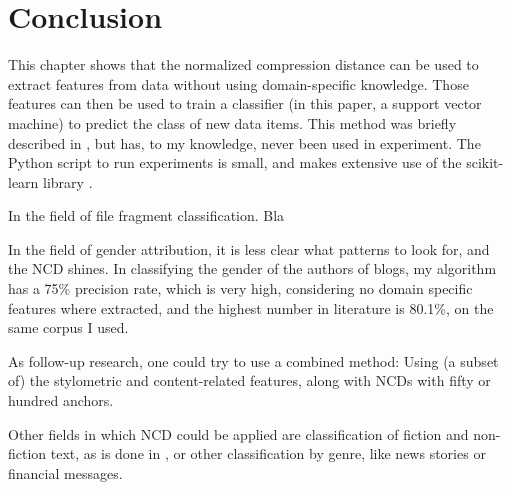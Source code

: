 \section{Conclusion}

This chapter shows that the normalized compression distance can be used to extract features from data without using domain-specific knowledge. Those features can then be used to train a classifier (in this paper, a support vector machine) to predict the class of new data items. This method was briefly described in \cite{Cilibrasi2007}, but has, to my knowledge, never been used in experiment. The Python script to run experiments is small, and makes extensive use of the scikit-learn library \cite{Pedregosa2011}.

In the field of file fragment classification. Bla

In the field of gender attribution, it is less clear what patterns to look for, and the NCD shines. In classifying the gender of the authors of blogs, my algorithm has a 75\% precision rate, which is very high, considering no domain specific features where extracted, and the highest number in literature is 80.1\%, on the same corpus I used.

As follow-up research, one could try to use a combined method: Using (a subset of) the stylometric and content-related features, along with NCDs with fifty or hundred anchors.

Other fields in which NCD could be applied are classification of fiction and non-fiction text, as is done in \cite{Koppel2002}, or other classification by genre, like news stories or financial messages.
